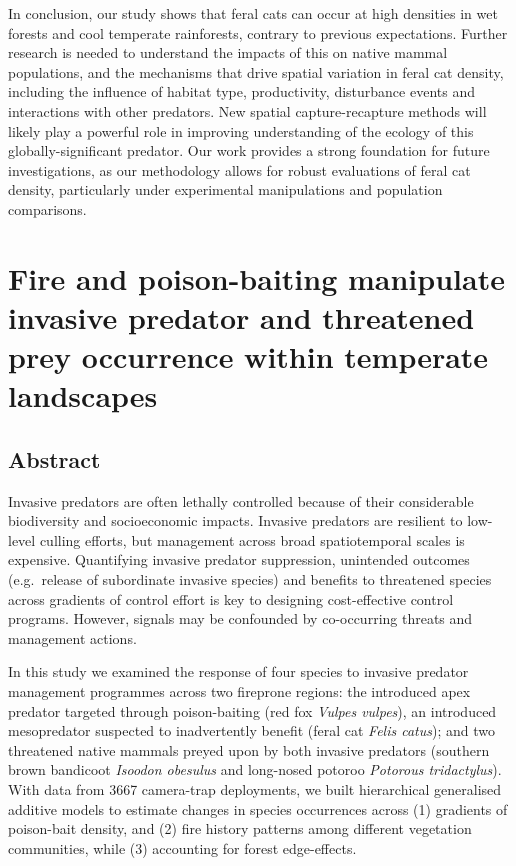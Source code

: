 \documentclass[11pt,a4paper,titlepage,twoside,openright]{style/unimelbthesis}
\begin{document}
\begin{mainmatter}
In conclusion, our study shows that feral cats can occur at high densities in wet forests and cool temperate rainforests, contrary to previous expectations. Further research is needed to understand the impacts of this on native mammal populations, and the mechanisms that drive spatial variation in feral cat density, including the influence of habitat type, productivity, disturbance events and interactions with other predators. New spatial capture-recapture methods will likely play a powerful role in improving understanding of the ecology of this globally-significant predator. Our work provides a strong foundation for future investigations, as our methodology allows for robust evaluations of feral cat density, particularly under experimental manipulations and population comparisons.

\hypertarget{occ}{%
\chapter{Fire and poison-baiting manipulate invasive predator and threatened prey occurrence within temperate landscapes}\label{occ}}

\hypertarget{abstract-1}{%
\section*{Abstract}\label{abstract-1}}

Invasive predators are often lethally controlled because of their considerable biodiversity and socioeconomic impacts. Invasive predators are resilient to low-level culling efforts, but management across broad spatiotemporal scales is expensive. Quantifying invasive predator suppression, unintended outcomes (e.g.~release of subordinate invasive species) and benefits to threatened species across gradients of control effort is key to designing cost-effective control programs. However, signals may be confounded by co-occurring threats and management actions.

In this study we examined the response of four species to invasive predator management programmes across two fireprone regions: the introduced apex predator targeted through poison-baiting (red fox \emph{Vulpes vulpes}), an introduced mesopredator suspected to inadvertently benefit (feral cat \emph{Felis catus}); and two threatened native mammals preyed upon by both invasive predators (southern brown bandicoot \emph{Isoodon obesulus} and long-nosed potoroo \emph{Potorous tridactylus}). With data from 3667 camera-trap deployments, we built hierarchical generalised additive models to estimate changes in species occurrences across (1) gradients of poison-bait density, and (2) fire history patterns among different vegetation communities, while (3) accounting for forest edge-effects.


\end{mainmatter}
\end{document}
